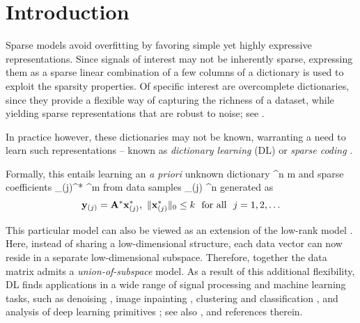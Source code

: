 \documentclass{article}
\def\[#1\]{{$#1$}}
\def\b#1{{\mathbf{#1}}}
\begin{document}
\vspace{-12pt}
\section{Introduction}
\vspace{-4pt}

Sparse models avoid overfitting by favoring simple yet highly expressive representations. Since signals of interest may not be inherently sparse, expressing them as a sparse linear combination of a few columns of a dictionary is used to exploit the sparsity properties. Of specific interest are overcomplete dictionaries, since they provide a flexible way of capturing the richness of a dataset, while yielding sparse representations that are robust to noise; see \cite{Mallat1993,Chen1998,Donoho2006}. 





In practice however, these dictionaries may not be known, warranting a need to {learn} such representations -- known as \textit{dictionary learning} (DL) or \textit{sparse coding} \citep{Olshausen97}. 





Formally, this entails learning an \textit{a priori} unknown dictionary \[\b{A} \in \RR^{n \times m}\] and sparse coefficients \[\b{x}_{(j)}^* \in \RR^{m}\] from data samples \[\b{y}_{(j)} \in \RR^{n}\] generated as
\vspace{-2pt}
\begin{align}\label{eq:model}
\b{y}_{(j)} = \b{A}^*\b{x}_{(j)}^*,~\|\b{x}_{(j)}^*\|_0 \leq k~~\text{for all}~~j = 1, 2, \dots \vspace{-2pt}
\end{align}

This particular model can also be viewed as an extension of the low-rank model \citep{Pearson1901}. Here, instead of sharing a low-dimensional structure, each data vector can now reside in a separate low-dimensional subspace. Therefore, together the data matrix admits a \textit{union-of-subspace} model. As a result of this additional flexibility, DL finds applications in a wide range of signal processing and machine learning tasks, such as denoising \citep{Elad2006}, image inpainting \citep{Mairal09}, clustering and classification \citep{Ramirez2010, Rambhatla2013sbmca,Rambhatla2016DRPCA, Rambhatla17DRPCAApp, Rambhatla18LrApp,Rambhatla18LrTheo}, and analysis of deep learning primitives \citep{Ranzato2007,Gregor2010}; see also \cite{Elad2010}, and references therein.
\end{document}
